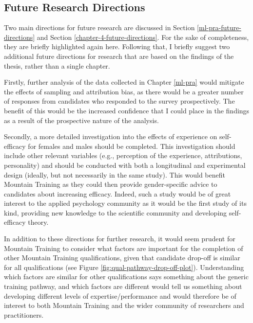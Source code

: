 \documentclass[
  12pt,
  a4paper,
]{book}
\begin{document}
\hypertarget{future-research-directions}{%
\subsection{Future Research Directions}\label{future-research-directions}}

Two main directions for future research are discussed in Section \ref{ml-pra-future-directions} and Section \ref{chapter-4-future-directions}. For the sake of completeness, they are briefly highlighted again here. Following that, I briefly suggest two additional future directions for research that are based on the findings of the thesis, rather than a single chapter.

Firstly, further analysis of the data collected in Chapter \ref{ml-pra} would mitigate the effects of sampling and attribution bias, as there would be a greater number of responses from candidates who responded to the survey prospectively. The benefit of this would be the increased confidence that I could place in the findings as a result of the prospective nature of the analysis.

Secondly, a more detailed investigation into the effects of experience on self-efficacy for females and males should be completed. This investigation should include other relevant variables (e.g., perception of the experience, attributions, personality) and should be conducted with both a longitudinal and experimental design (ideally, but not necessarily in the same study). This would benefit Mountain Training as they could then provide gender-specific advice to candidates about increasing efficacy. Indeed, such a study would be of great interest to the applied psychology community as it would be the first study of its kind, providing new knowledge to the scientific community and developing self-efficacy theory.

In addition to these directions for further research, it would seem prudent for Mountain Training to consider what factors are important for the completion of other Mountain Training qualifications, given that candidate drop-off is similar for all qualifications (see Figure \ref{fig:qual-pathway-drop-off-plot}). Understanding which factors are similar for other qualifications says something about the generic training pathway, and which factors are different would tell us something about developing different levels of expertise/performance and would therefore be of interest to both Mountain Training and the wider community of researchers and practitioners.
\end{document}
